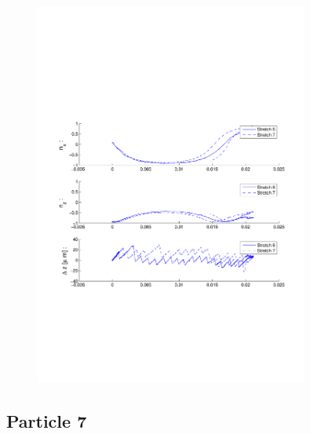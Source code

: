 \begin{figure}[ H]

\centering

\includegraphics[width=0.8\textwidth]{Images/Particle 2/Stretch6.pdf}

\end{figure}


\subsection{Particle 7}

